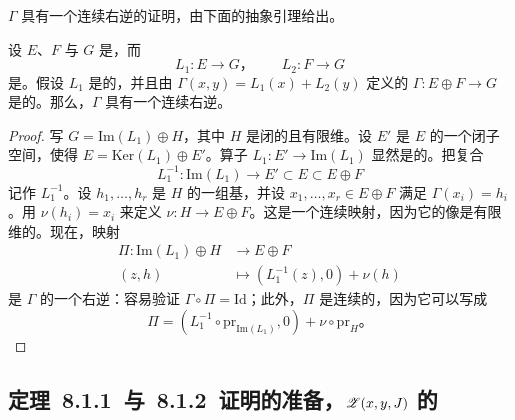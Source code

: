 $\Gamma$ 具有一个连续右逆的证明，由下面的抽象引理给出。

\begin{lemma}\label{thm:continuous-right-inverse}
设 $E$、$F$ 与 $G$ 是\trBanachSpace，而
\[
L_{1}\colon E\to G\text{，}\qquad L_{2}\colon F\to G
\]
是\trLinearOperator。假设 $L_{1}$ 是\trFredholm{}的，并且由 $\Gamma(x,y)=L_{1}(x)+L_{2}(y)$ 定义的 $\Gamma\colon E\oplus F\to G$ 是\trSurjective{}的。那么，$\Gamma$ 具有一个连续右逆。
\end{lemma}

\begin{proof}
写 $G=\mathrm{Im}(L_{1})\oplus H$，其中 $H$ 是闭的且有限维。设 $E'$ 是 $E$ 的一个闭子空间，使得 $E=\mathrm{Ker}(L_{1})\oplus E'$。算子 $L_{1}\colon E'\to\mathrm{Im}(L_{1})$ 显然是\trBijective{}的。把复合
\[
L_{1}^{-1}\colon\mathrm{Im}(L_{1})\longrightarrow E'\subset E\subset E\oplus F
\]
记作 $L_{1}^{-1}$。设 $h_{1},\dots,h_{r}$ 是 $H$ 的一组基，并设 $x_{1},\dots,x_{r}\in E\oplus F$ 满足 $\Gamma(x_{i})=h_{i}$。用 $\nu(h_{i})=x_{i}$ 来定义 $\nu\colon H\to E\oplus F$。这是一个连续映射，因为它的像是有限维的。现在，映射
\[
\begin{aligned}
\Pi\colon\mathrm{Im}(L_{1})\oplus H&\longrightarrow E\oplus F\\
(z,h)&\longmapsto(L_{1}^{-1}(z),0)+\nu(h)
\end{aligned}
\]
是 $\Gamma$ 的一个右逆：容易验证 $\Gamma\circ\Pi=\mathrm{Id}$；此外，$\Pi$ 是连续的，因为它可以写成
\[
\Pi=(L_{1}^{-1}\circ\mathrm{pr}_{\mathrm{Im}(L_{1})},0)+\nu\circ\mathrm{pr}_{H}\text{。}
\]
\end{proof}

\subsection{定理~8.1.1~与~8.1.2~证明的准备，$\mathscr{Z}(x,y,J)$ 的\trTangentSpace}
\label{subsec:tangent-space-z}

